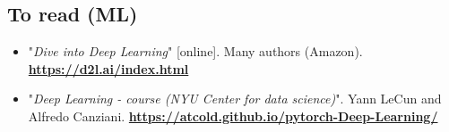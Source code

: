 \documentclass[11pt, a4paper]{article}
\newcommand{\kurl}[1]{{\scriptsize\bfseries\url{#1}}}
\begin{document}
\subsection{To read (ML)}

\begin{itemize}
	\item "\textit{Dive into Deep Learning}" [online].
	Many authors (Amazon).
	\kurl{https://d2l.ai/index.html}
	
	\item "\textit{Deep Learning - course (NYU Center for data science)}".
	Yann LeCun and Alfredo Canziani.
	\kurl{https://atcold.github.io/pytorch-Deep-Learning/}
\end{itemize}
\end{document}

